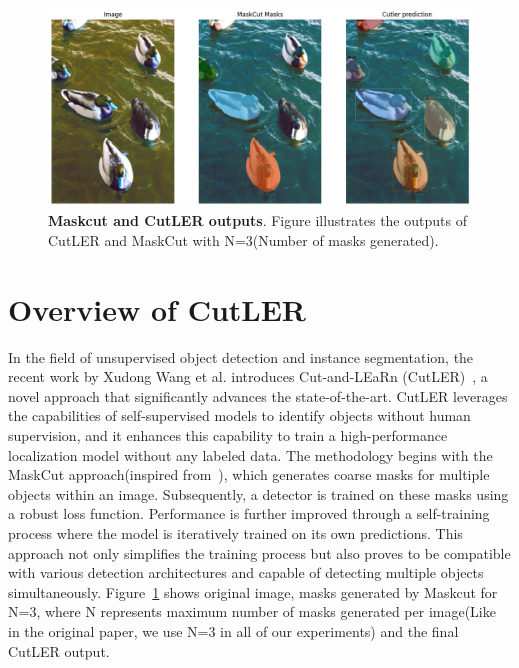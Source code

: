 %
\begin{figure}
	\centering
	\includegraphics[width=1\textwidth]{Images/main/intro_cutler_pic.png}
	\caption[\textbf{Comparison of MaskCut and CutLER outputs}]{\textbf{Maskcut and CutLER outputs}. Figure illustrates the outputs of CutLER and MaskCut with N=3(Number of masks generated).}
	\label{fig:mask_cut_cutler_comparison}
\end{figure}

\section{Overview of CutLER}
In the field of unsupervised object detection and instance segmentation, the recent work by Xudong Wang et al. introduces Cut-and-LEaRn (CutLER)~\cite{wang2023cut}, a novel approach that significantly advances the state-of-the-art. CutLER leverages the capabilities of self-supervised models to identify objects without human supervision, and it enhances this capability to train a high-performance localization model without any labeled data. The methodology begins with the MaskCut approach(inspired from~\cite{wang2022tokencut}), which generates coarse masks for multiple objects within an image. Subsequently, a detector is trained on these masks using a robust loss function. Performance is further improved through a self-training process where the model is iteratively trained on its own predictions. This approach not only simplifies the training process but also proves to be compatible with various detection architectures and capable of detecting multiple objects simultaneously. Figure~\ref{fig:mask_cut_cutler_comparison} shows original image, masks generated by Maskcut for N=3, where N represents maximum number of masks generated per image(Like in the original paper, we use N=3 in all of our experiments) and the final CutLER output.

